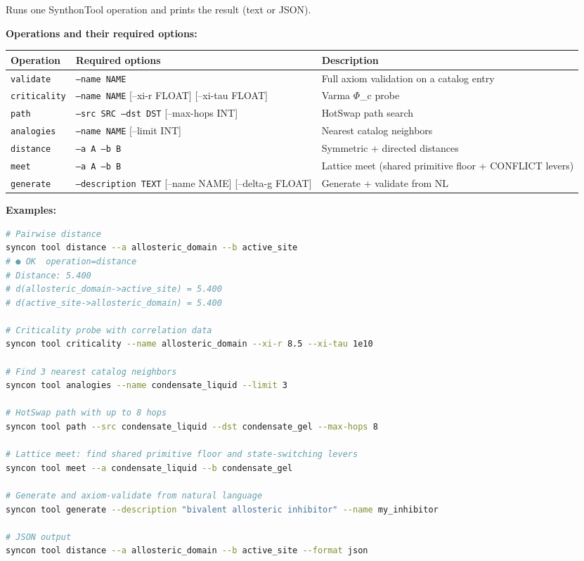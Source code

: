 \documentclass[12pt,a4paper]{article}
\begin{document}
Runs one SynthonTool operation and prints the result (text or JSON).

\textbf{Operations and their required options:}

\begin{table}[htbp]
\centering
\small
{}
\begin{tabularx}{\textwidth}{>{\centering\arraybackslash}X >{\centering\arraybackslash}X >{\centering\arraybackslash}X}
\toprule
\rowcolor{gray!25}\textbf{Operation} & \textbf{Required options} & \textbf{Description} \\
\midrule
\rowcolors{1}{white}{gray!10}
\texttt{validate} & \texttt{--name NAME} & Full axiom validation on a catalog entry \\
\texttt{criticality} & \texttt{--name NAME} {[}--xi-r FLOAT{]} {[}--xi-tau FLOAT{]} & Varma $\Phi$\_c probe \\
\texttt{path} & \texttt{--src SRC --dst DST} {[}--max-hops INT{]} & HotSwap path search \\
\texttt{analogies} & \texttt{--name NAME} {[}--limit INT{]} & Nearest catalog neighbors \\
\texttt{distance} & \texttt{--a A --b B} & Symmetric + directed distances \\
\texttt{meet} & \texttt{--a A --b B} & Lattice meet (shared primitive floor + CONFLICT levers) \\
\texttt{generate} & \texttt{--description TEXT} {[}--name NAME{]} {[}--delta-g FLOAT{]} & Generate + validate from NL \\
\bottomrule
\end{tabularx}
\end{table}

\textbf{Examples:}

\begin{lstlisting}[language=bash]
# Pairwise distance
syncon tool distance --a allosteric_domain --b active_site
# ● OK  operation=distance
# Distance: 5.400
# d(allosteric_domain->active_site) = 5.400
# d(active_site->allosteric_domain) = 5.400

# Criticality probe with correlation data
syncon tool criticality --name allosteric_domain --xi-r 8.5 --xi-tau 1e10

# Find 3 nearest catalog neighbors
syncon tool analogies --name condensate_liquid --limit 3

# HotSwap path with up to 8 hops
syncon tool path --src condensate_liquid --dst condensate_gel --max-hops 8

# Lattice meet: find shared primitive floor and state-switching levers
syncon tool meet --a condensate_liquid --b condensate_gel

# Generate and axiom-validate from natural language
syncon tool generate --description "bivalent allosteric inhibitor" --name my_inhibitor

# JSON output
syncon tool distance --a allosteric_domain --b active_site --format json
\end{lstlisting}
\end{document}

